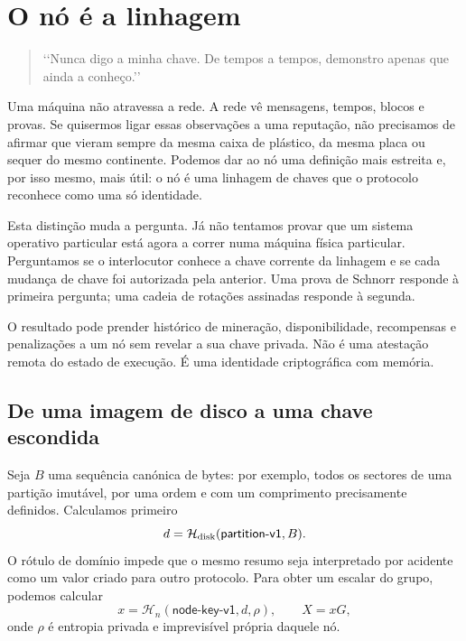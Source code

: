 
\chapter{O nó é a linhagem}
\label{chapter:unwritten-node-identity}

\begin{quote}
\lq\lq Nunca digo a minha chave. De tempos a tempos, demonstro apenas que ainda a
conheço.\rq\rq
\end{quote}

Uma máquina não atravessa a rede. A rede vê mensagens, tempos, blocos e provas.
Se quisermos ligar essas observações a uma reputação, não precisamos de afirmar
que vieram sempre da mesma caixa de plástico, da mesma placa ou sequer do mesmo
continente. Podemos dar ao nó uma definição mais estreita e, por isso mesmo,
mais útil: o nó é uma linhagem de chaves que o protocolo reconhece como uma só
identidade.

Esta distinção muda a pergunta. Já não tentamos provar que um sistema operativo
particular está agora a correr numa máquina física particular. Perguntamos se o
interlocutor conhece a chave corrente da linhagem e se cada mudança de chave foi
autorizada pela anterior. Uma prova de Schnorr responde à primeira pergunta; uma
cadeia de rotações assinadas responde à segunda.

O resultado pode prender histórico de mineração, disponibilidade, recompensas e
penalizações a um nó sem revelar a sua chave privada. Não é uma atestação remota
do estado de execução. É uma identidade criptográfica com memória.

\section{De uma imagem de disco a uma chave escondida}

Seja \(B\) uma sequência canónica de bytes: por exemplo, todos os sectores de
uma partição imutável, por uma ordem e com um comprimento precisamente
definidos. Calculamos primeiro
\[
    d=\mathcal H_{\rm disk}(\mathsf{partition\mbox{-}v1},B).
\]
O rótulo de domínio impede que o mesmo resumo seja interpretado por acidente
como um valor criado para outro protocolo. Para obter um escalar do grupo,
podemos calcular
\[
    x=\mathcal H_n(\mathsf{node\mbox{-}key\mbox{-}v1},d,\rho),
    \qquad X=xG,
\]
onde \(\rho\) é entropia privada e imprevisível própria daquele nó.

